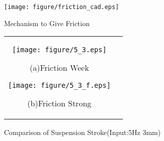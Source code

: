 \documentclass[a4paper,12pt]{article_vdlab_sotsuron}
\begin{document}
\vspace*{10mm}
\begin{figure}[h!]
 \centering
 \texttt{[image: figure/friction\_cad.eps]}
 \vspace*{3mm}
  \caption{Mechanism to Give Friction}
 \label{fig:testing_machine_f}
\end{figure}

\vspace*{10mm}
\begin{figure}[h!]
  \begin{tabular}{cc}
  \begin{minipage}{0.5\hsize}
  \begin{center}
    \texttt{[image: figure/5\_3.eps]}
    \end{center}
    \begin{center}
    \ (a)Friction Week\
    \end{center}
  \end{minipage}
  \begin{minipage}{0.5\hsize}
     \begin{center}
      \texttt{[image: figure/5\_3\_f.eps]}
      \end{center}
      \begin{center}
      \ (b)Friction Strong\
    \end{center}
  \end{minipage}
  \end{tabular}
  \vspace*{3mm}
  \caption{Comparison of Suspension Stroke(Input:5Hz 3mm)}
    \label{fig:HILS_fri_5_3}
\end{figure}
\end{document}
